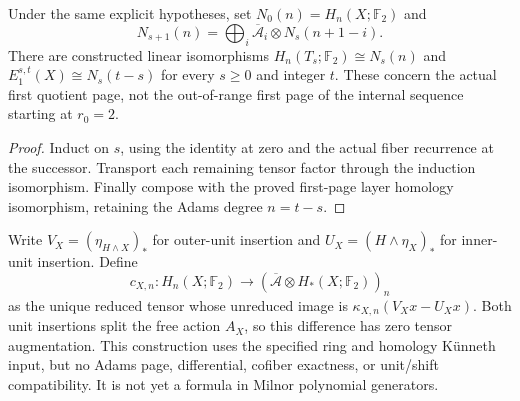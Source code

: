 \begin{proposition}
  \label{prop:h6-iterated-cooperation-coordinates}
  \leanok
  Under the same explicit hypotheses, set $N_0(n)=H_n(X;\mathbb F_2)$ and
  \[
    N_{s+1}(n)=\bigoplus_i\overline{\mathcal A}_i\otimes N_s(n+1-i).
  \]
  There are constructed linear isomorphisms
  $H_n(T_s;\mathbb F_2)\cong N_s(n)$ and
  $E_1^{s,t}(X)\cong N_s(t-s)$ for every $s\geq0$ and integer $t$.
  These concern the actual first quotient page, not the out-of-range
  first page of the internal sequence starting at $r_0=2$.
\end{proposition}
\begin{proof}
  Induct on $s$, using the identity at zero and the actual fiber recurrence
  at the successor. Transport each remaining tensor factor through the
  induction isomorphism. Finally compose with the proved first-page layer
  homology isomorphism, retaining the Adams degree $n=t-s$.
  \leanok
\end{proof}

\begin{definition}
  \label{def:h6-reduced-cobar-step}
  \leanok
  Write $V_X=(\eta_{H\wedge X})_*$ for outer-unit insertion and
  $U_X=(H\wedge\eta_X)_*$ for inner-unit insertion. Define
  \[
    c_{X,n}:H_n(X;\mathbb F_2)
       \longrightarrow(\overline{\mathcal A}\otimes H_*(X;\mathbb F_2))_n
  \]
  as the unique reduced tensor whose unreduced image is
  $\kappa_{X,n}(V_Xx-U_Xx)$.
  Both unit insertions split the free action $A_X$, so this difference
  has zero tensor augmentation. This construction uses the specified
  ring and homology K\"unneth input, but no Adams page, differential,
  cofiber exactness, or unit/shift compatibility.
  It is not yet a formula in Milnor polynomial generators.
\end{definition}

